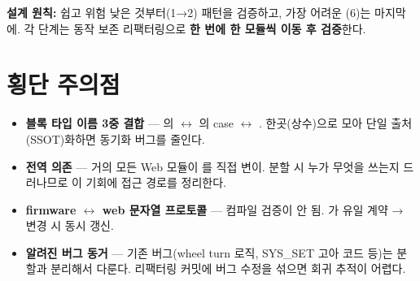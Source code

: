 \noindent\textbf{설계 원칙:} 쉽고 위험 낮은 것부터(1→2) 패턴을 검증하고, 가장 어려운
(6)는 마지막에. 각 단계는 동작 보존 리팩터링으로 \textbf{한 번에 한
모듈씩 이동 후 검증}한다.

\section{횡단 주의점}
\begin{itemize}
  \item \textbf{블록 타입 이름 3중 결합} --- 의 
  $\leftrightarrow$ 의 case $\leftrightarrow$ .
  한곳(상수)으로 모아 단일 출처(SSOT)화하면 동기화 버그를 줄인다.
  \item \textbf{ 전역 의존} --- 거의 모든 Web 모듈이 를 직접
  변이. 분할 시 누가 무엇을 쓰는지 드러나므로 이 기회에 접근 경로를 정리한다.
  \item \textbf{firmware $\leftrightarrow$ web 문자열 프로토콜} --- 컴파일 검증이 안 됨.
  가 유일 계약 → 변경 시 동시 갱신.
  \item \textbf{알려진 버그 동거} --- 기존 버그(wheel turn 로직, SYS\_SET 고아 코드 등)는
  분할과 분리해서 다룬다. 리팩터링 커밋에 버그 수정을 섞으면 회귀 추적이 어렵다.
\end{itemize}
